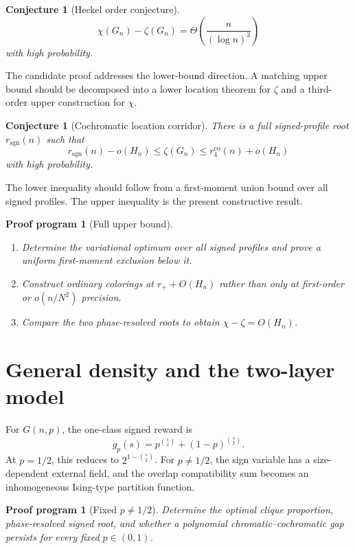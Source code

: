 \documentclass[11pt]{article}
\newtheorem{conjecture}[theorem]{Conjecture}
\newtheorem{program}[theorem]{Proof program}
\theoremstyle{definition}
\newcommand{\rplus}{r_+}
\newcommand{\rco}{r_4^{\mathrm{co}}}
\begin{document}
\begin{conjecture}[Heckel order conjecture]
\[
 \chi(G_n)-\zeta(G_n)
 =\Theta\left(\frac n{(\log n)^3}\right)
\]
with high probability.
\end{conjecture}

The candidate proof addresses the lower-bound direction.  A matching upper
bound should be decomposed into a lower location theorem for $\zeta$ and a
third-order upper construction for $\chi$.

\begin{conjecture}[Cochromatic location corridor]
There is a full signed-profile root $r_{\mathrm{sgn}}(n)$ such that
\[
 r_{\mathrm{sgn}}(n)-o(H_n)
 \le\zeta(G_n)
 \le\rco(n)+o(H_n)
\]
with high probability.
\end{conjecture}

The lower inequality should follow from a first-moment union bound over all
signed profiles.  The upper inequality is the present constructive result.

\begin{program}[Full upper bound]
\begin{enumerate}[label=(\roman*)]
\item Determine the variational optimum over all signed profiles and prove a
uniform first-moment exclusion below it.
\item Construct ordinary colorings at $\rplus+O(H_n)$ rather than only at
first-order or $o(n/N^2)$ precision.
\item Compare the two phase-resolved roots to obtain
$\chi-\zeta=O(H_n)$.
\end{enumerate}
\end{program}

\section{General density and the two-layer model}

For $G(n,p)$, the one-class signed reward is
\[
 g_p(s)=p^{\binom s2}+(1-p)^{\binom s2}.
\]
At $p=1/2$, this reduces to $2^{1-\binom s2}$.  For $p\ne1/2$, the sign
variable has a size-dependent external field, and the overlap compatibility
sum becomes an inhomogeneous Ising-type partition function.

\begin{program}[Fixed $p\ne1/2$]
Determine the optimal clique proportion, phase-resolved signed root, and
whether a polynomial chromatic--cochromatic gap persists for every fixed
$p\in(0,1)$.
\end{program}
\end{document}
